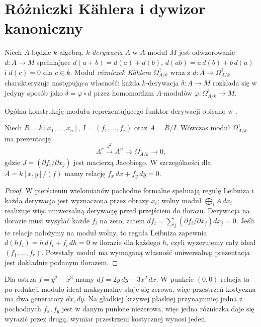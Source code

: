 \section{Różniczki Kählera i dywizor kanoniczny}
\label{sec:differentials}

\begin{definicja}
Niech $A$ będzie $k$-algebrą. $k$-\emph{derywacją}
$A$ w $A$-moduł $M$ jest odwzorowanie
$d:A\to M$ spełniające $d(a+b)=d(a)+d(b)$,
$d(ab)=a\,d(b)+b\,d(a)$ i $d(c)=0$ dla $c\in k$.
Moduł \emph{różniczek Kählera} $\Omega^1_{A/k}$
wraz z $d:A\to\Omega^1_{A/k}$ charakteryzuje
następująca własność: każda $k$-derywacja
$\delta:A\to M$ rozkłada się w jedyny sposób
jako $\delta=\varphi\circ d$ przez homomorfizm
$A$-modułów $\varphi:\Omega^1_{A/k}\to M$.
\end{definicja}

Ogólną konstrukcję modułu reprezentującego funktor derywacji opisano w .

\begin{stwierdzenie}
\label{st:kahler}
Niech $R=k[x_1,\ldots,x_n]$, $I=(f_1,\ldots,f_r)$
oraz $A=R/I$. Wówczas moduł $\Omega^1_{A/k}$ ma prezentację
\[
 A^r\xrightarrow{J^T}A^n\longrightarrow
 \Omega^1_{A/k}\longrightarrow0,
\]
gdzie $J=(\partial f_i/\partial x_j)$ jest
macierzą Jacobiego. W szczególności dla
$A=k[x,y]/(f)$ mamy relację $f_x\,dx+f_y\,dy=0$.
\end{stwierdzenie}
\begin{proof}
W pierścieniu wielomianów pochodne formalne
spełniają regułę Leibniza i każda derywacja
jest wyznaczona przez obrazy $x_i$;
wolny moduł $\bigoplus_i A\,dx_i$ realizuje więc
uniwersalną derywację przed przejściem do ilorazu.
Derywacja na ilorazie musi wysyłać każde $f_i$
na zero, zatem $df_i=\sum_j(\partial f_i/\partial x_j)dx_j=0$.
Jeśli te relacje nałożymy na moduł wolny,
to reguła Leibniza zapewnia $d(hf_i)=h\,df_i+f_i\,dh=0$
w ilorazie dla każdego $h$, czyli wyzerujemy
cały ideał $(f_1,\ldots,f_r)$. Powstały moduł
ma wymaganą własność uniwersalną; prezentacja
jest dokładnie podanym ilorazem.
\end{proof}

\begin{przyklad}
Dla ostrza $f=y^2-x^3$ mamy
$df=2y\,dy-3x^2\,dx$. W punkcie $(0,0)$
relacja ta po redukcji modulo ideał maksymalny
staje się zerowa, więc przestrzeń kostyczna
ma dwa generatory $dx,dy$. Na gładkiej krzywej
płaskiej przynajmniej jedna z pochodnych $f_x,f_y$
jest w danym punkcie niezerowa, więc jedna
różniczka daje się wyrazić przez drugą;
wymiar przestrzeni kostycznej wynosi jeden.
\end{przyklad}

